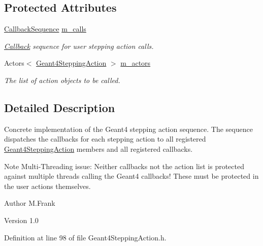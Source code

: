 \subsection*{Protected Attributes}
\begin{DoxyCompactItemize}
\item 
\hyperlink{struct_d_d4hep_1_1_callback_sequence}{CallbackSequence} \hyperlink{class_d_d4hep_1_1_simulation_1_1_geant4_stepping_action_sequence_a336da2773a5c1c830f1b338a32a0aa7e}{m\_\-calls}
\begin{DoxyCompactList}\small\item\em \hyperlink{class_d_d4hep_1_1_callback}{Callback} sequence for user stepping action calls. \item\end{DoxyCompactList}\item 
Actors$<$ \hyperlink{class_d_d4hep_1_1_simulation_1_1_geant4_stepping_action}{Geant4SteppingAction} $>$ \hyperlink{class_d_d4hep_1_1_simulation_1_1_geant4_stepping_action_sequence_a09eb0634934bffe70733ba62589456c2}{m\_\-actors}
\begin{DoxyCompactList}\small\item\em The list of action objects to be called. \item\end{DoxyCompactList}\end{DoxyCompactItemize}


\subsection{Detailed Description}
Concrete implementation of the Geant4 stepping action sequence. The sequence dispatches the callbacks for each stepping action to all registered \hyperlink{class_d_d4hep_1_1_simulation_1_1_geant4_stepping_action}{Geant4SteppingAction} members and all registered callbacks.

Note Multi-\/Threading issue: Neither callbacks not the action list is protected against multiple threads calling the Geant4 callbacks! These must be protected in the user actions themselves.

\begin{DoxyAuthor}{Author}
M.Frank 
\end{DoxyAuthor}
\begin{DoxyVersion}{Version}
1.0 
\end{DoxyVersion}


Definition at line 98 of file Geant4SteppingAction.h.


